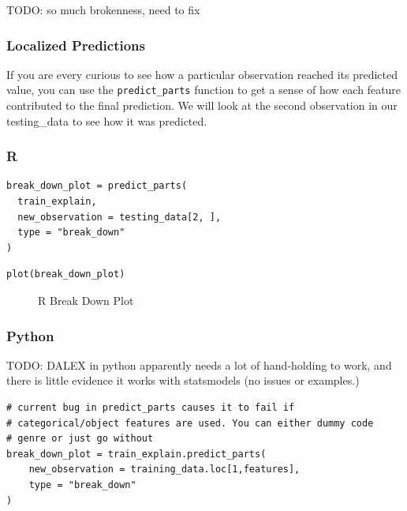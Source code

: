 \documentclass[
  letterpaper,
]{krantz}
\begin{document}
TODO: so much brokenness, need to fix

\subsubsection{Localized Predictions}\label{localized-predictions}

If you are every curious to see how a particular observation reached its
predicted value, you can use the \texttt{predict\_parts} function to get
a sense of how each feature contributed to the final prediction. We will
look at the second observation in our testing\_data to see how it was
predicted.

\subsubsection{R}

\begin{verbatim}
break_down_plot = predict_parts(
  train_explain, 
  new_observation = testing_data[2, ], 
  type = "break_down"
)
\end{verbatim}

\begin{verbatim}
plot(break_down_plot)
\end{verbatim}

\begin{figure}[H]


\caption{\label{fig-r-break-down}R Break Down Plot}

\end{figure}%

\subsubsection{Python}

TODO: DALEX in python apparently needs a lot of hand-holding to work,
and there is little evidence it works with statsmodels (no issues or
examples.)

\begin{verbatim}
# current bug in predict_parts causes it to fail if 
# categorical/object features are used. You can either dummy code
# genre or just go without
break_down_plot = train_explain.predict_parts(
    new_observation = training_data.loc[1,features],
    type = "break_down"
)
\end{verbatim}
\end{document}

